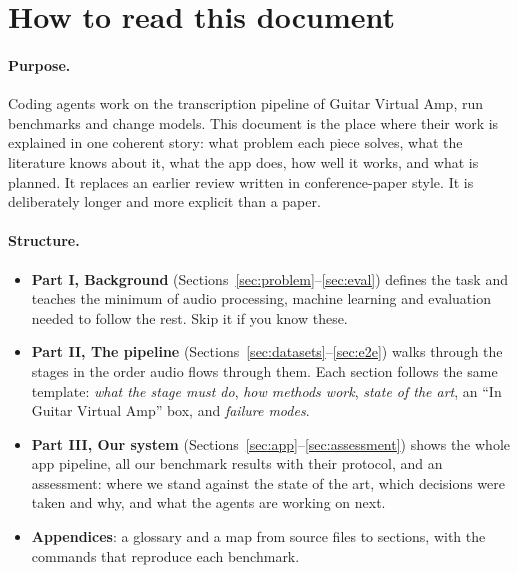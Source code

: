 \section*{How to read this document}

\paragraph{Purpose.} Coding agents work on the transcription pipeline of Guitar
Virtual Amp, run benchmarks and change models. This document is the place where
their work is explained in one coherent story: what problem each piece solves,
what the literature knows about it, what the app does, how well it works, and
what is planned. It replaces an earlier review written in conference-paper
style. It is deliberately longer and more explicit than a paper.

\paragraph{Structure.}
\begin{itemize}
\item \textbf{Part I, Background} (Sections~\ref{sec:problem}--\ref{sec:eval})
  defines the task and teaches the minimum of audio processing, machine
  learning and evaluation needed to follow the rest. Skip it if you know these.
\item \textbf{Part II, The pipeline} (Sections~\ref{sec:datasets}--\ref{sec:e2e})
  walks through the stages in the order audio flows through them. Each section
  follows the same template: \emph{what the stage must do}, \emph{how methods
  work}, \emph{state of the art}, an ``In Guitar Virtual Amp'' box, and
  \emph{failure modes}.
\item \textbf{Part III, Our system} (Sections~\ref{sec:app}--\ref{sec:assessment})
  shows the whole app pipeline, all our benchmark results with their protocol,
  and an assessment: where we stand against the state of the art, which
  decisions were taken and why, and what the agents are working on next.
\item \textbf{Appendices}: a glossary and a map from source files to sections,
  with the commands that reproduce each benchmark.
\end{itemize}

